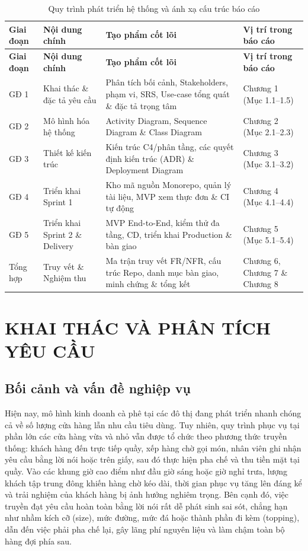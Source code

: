 \documentclass[12pt,a4paper]{report}
\begin{document}
\begin{longtable}{>{\centering\arraybackslash}p{1.8cm}>{\raggedright\arraybackslash}p{3.6cm}>{\raggedright\arraybackslash}p{6.0cm}>{\raggedright\arraybackslash}p{3.4cm}}
\caption{Quy trình phát triển hệ thống và ánh xạ cấu trúc báo cáo}\\
\hline
\rowcolor{gray!20} \textbf{Giai đoạn} & \textbf{Nội dung chính} & \textbf{Tạo phẩm cốt lõi} & \textbf{Vị trí trong báo cáo} \\
\hline
\endfirsthead
\hline
\rowcolor{gray!20} \textbf{Giai đoạn} & \textbf{Nội dung chính} & \textbf{Tạo phẩm cốt lõi} & \textbf{Vị trí trong báo cáo} \\
\hline
\endhead
GĐ 1 & Khai thác \& đặc tả yêu cầu & Phân tích bối cảnh, Stakeholders, phạm vi, SRS, Use-case tổng quát \& đặc tả trọng tâm & Chương 1 (Mục 1.1--1.5) \\
\hline
GĐ 2 & Mô hình hóa hệ thống & Activity Diagram, Sequence Diagram \& Class Diagram & Chương 2 (Mục 2.1--2.3) \\
\hline
GĐ 3 & Thiết kế kiến trúc & Kiến trúc C4/phân tầng, các quyết định kiến trúc (ADR) \& Deployment Diagram & Chương 3 (Mục 3.1--3.2) \\
\hline
GĐ 4 & Triển khai Sprint 1 & Kho mã nguồn Monorepo, quản lý tài liệu, MVP xem thực đơn \& CI tự động & Chương 4 (Mục 4.1--4.4) \\
\hline
GĐ 5 & Triển khai Sprint 2 \& Delivery & MVP End-to-End, kiểm thử đa tầng, CD, triển khai Production \& bàn giao & Chương 5 (Mục 5.1--5.4) \\
\hline
Tổng hợp & Truy vết \& Nghiệm thu & Ma trận truy vết FR/NFR, cấu trúc Repo, danh mục bàn giao, minh chứng \& tổng kết & Chương 6, Chương 7 \& Chương 8 \\
\hline
\end{longtable}
\newpage

\chapter{KHAI THÁC VÀ PHÂN TÍCH YÊU CẦU}

\section{Bối cảnh và vấn đề nghiệp vụ}

Hiện nay, mô hình kinh doanh cà phê tại các đô thị đang phát triển nhanh chóng cả về số lượng cửa hàng lẫn nhu cầu tiêu dùng. Tuy nhiên, quy trình phục vụ tại phần lớn các cửa hàng vừa và nhỏ vẫn được tổ chức theo phương thức truyền thống: khách hàng đến trực tiếp quầy, xếp hàng chờ gọi món, nhân viên ghi nhận yêu cầu bằng lời nói hoặc trên giấy, sau đó thực hiện pha chế và thu tiền mặt tại quầy. Vào các khung giờ cao điểm như đầu giờ sáng hoặc giờ nghỉ trưa, lượng khách tập trung đông khiến hàng chờ kéo dài, thời gian phục vụ tăng lên đáng kể và trải nghiệm của khách hàng bị ảnh hưởng nghiêm trọng. Bên cạnh đó, việc truyền đạt yêu cầu hoàn toàn bằng lời nói rất dễ phát sinh sai sót, chẳng hạn như nhầm kích cỡ (size), mức đường, mức đá hoặc thành phần đi kèm (topping), dẫn đến việc phải pha chế lại, gây lãng phí nguyên liệu và làm chậm toàn bộ hàng đợi phía sau.
\end{document}
